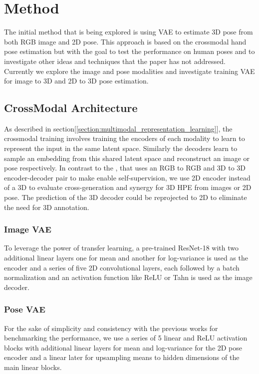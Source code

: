 \chapter{Method}
The initial method that is being explored is using \ac{VAE} to estimate 3D pose from both RGB image and 2D pose. This approach is based on the crossmodal hand pose estimation \cite{crossmodal} but with the goal to test the performance on human poses and to investigate other ideas and techniques that the paper has not addressed. Currently we explore the image and pose modalities and investigate training \ac{VAE} for image to 3D and 2D to 3D pose estimation.

\section{CrossModal Architecture}
As described in section[\ref{section:multimodal_representation_learning}], the crossmodal training involves training the encoders of each modality to learn to represent the input in the same latent space. Similarly the decoders learn to sample an embedding from this shared latent space and reconstruct an image or pose respectively. In contrast to the \cite{crossmodal}, that uses an RGB to RGB and 3D to 3D encoder-decoder pair to make enable self-supervision, we use 2D encoder instead of a 3D to evaluate cross-generation and synergy for 3D \ac{HPE} from images or 2D pose. The prediction of the 3D decoder could be reprojected to 2D to eliminate the need for 3D annotation. 

\subsection{Image \ac{VAE}}
To leverage the power of transfer learning, a pre-trained ResNet-18 \cite{resnet} with two additional linear layers one for mean and another for log-variance is used as the encoder and a series of five 2D convolutional layers, each followed by a batch normalization and an activation function like ReLU or Tahn is used as the image decoder. 

\subsection{Pose \ac{VAE}}
For the sake of simplicity and consistency with the previous works for benchmarking the performance, we use a series of 5 linear and ReLU activation blocks with additional linear layers for mean and log-variance for the 2D pose encoder and a linear later for upsampling means to hidden dimensions of the main linear blocks.

